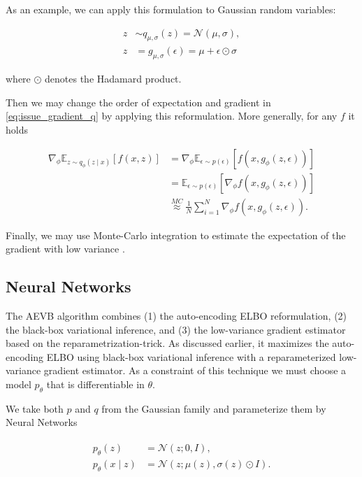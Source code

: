 \documentclass[11pt]{article}
\theoremstyle{plain}
\theoremstyle{definition}
\theoremstyle{plain}
\begin{document}
As an example, we can apply this formulation to Gaussian random variables:

\begin{equation}
\begin{aligned}z & \sim q_{\mu,\sigma}(z)=\mathcal{N}(\mu,\sigma),\\
z & =g_{\mu,\sigma}(\epsilon)=\mu+\epsilon\odot\sigma
\end{aligned}
\end{equation}

where $\odot$ denotes the Hadamard product.

Then we may change the order of expectation and gradient in \eqref{eq:issue_gradient_q}
by applying this reformulation. More generally, for any $f$ it holds 

\begin{equation}
\begin{aligned}\nabla_{\phi}\mathbb{E}_{z\sim q_{\phi}(z\mid x)}\left[f(x,z)\right] & =\nabla_{\phi}\mathbb{E}_{\epsilon\sim p(\epsilon)}\left[f(x,g_{\phi}(z,\epsilon))\right]\\
 & =\mathbb{E}_{\epsilon\sim p(\epsilon)}\left[\nabla_{\phi}f(x,g_{\phi}(z,\epsilon))\right]\\
 & \overset{MC}{\approx}\frac{1}{N}\sum_{i=1}^{N}\nabla_{\phi}f(x,g_{\phi}(z,\epsilon)).
\end{aligned}
\end{equation}

Finally, we may use Monte-Carlo integration to estimate the expectation
of the gradient with low variance \cite{icml2014c2_rezende14}. 

\subsection{Neural Networks}

The AEVB algorithm combines (1) the auto-encoding ELBO reformulation,
(2) the black-box variational inference, and (3) the low-variance
gradient estimator based on the reparametrization-trick. As discussed
earlier, it maximizes the auto-encoding ELBO using black-box variational
inference with a reparameterized low-variance gradient estimator.
As a constraint of this technique we must choose a model $p_{\theta}$
that is differentiable in $\theta$.

We take both $p$ and $q$ from the Gaussian family and parameterize
them by Neural Networks

\begin{align}
\begin{aligned}p_{\theta}(z) & =\mathcal{N}(z;0,I),\\
p_{\theta}(x\mid z) & =\mathcal{N}(z;\mu(z),\sigma(z)\odot I).
\end{aligned}
\end{align}
\end{document}
